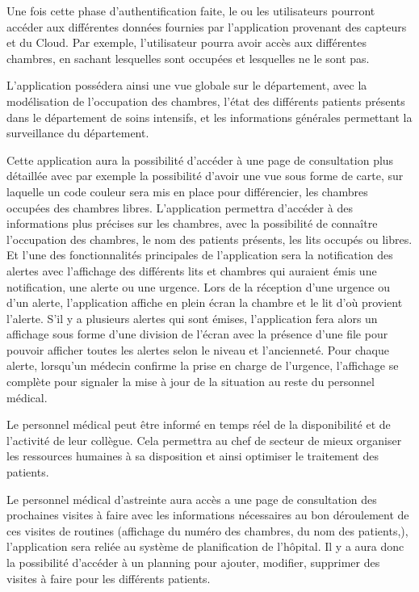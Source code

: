 Une fois cette phase d’authentification faite, le ou les utilisateurs pourront accéder aux différentes données fournies par l’application provenant des capteurs et du Cloud. Par exemple, l’utilisateur pourra avoir accès aux différentes chambres, en sachant lesquelles sont occupées et lesquelles ne le sont pas.


L’application possédera ainsi une vue globale sur le département, avec la modélisation de l’occupation des chambres, l’état des différents patients présents dans le département de soins intensifs, et les informations générales permettant la surveillance du département.

Cette application aura la possibilité d’accéder à une page de consultation plus détaillée avec par exemple la possibilité d’avoir une vue sous forme de carte, sur laquelle un code couleur sera mis en place pour différencier, les chambres occupées des chambres libres. L’application permettra d’accéder à des informations plus précises sur les chambres, avec la possibilité de connaître l’occupation des chambres, le nom des patients présents, les lits occupés ou libres. Et l’une des fonctionnalités principales de l’application sera la notification des alertes avec l’affichage des différents lits et chambres qui auraient émis une notification, une alerte ou une urgence. Lors de la réception d’une urgence ou d’un alerte, l’application affiche en plein écran la chambre et le lit d’où provient l’alerte. S’il y a plusieurs alertes qui sont émises, l’application fera alors un affichage sous forme d’une division de l’écran avec la présence d’une file pour pouvoir afficher toutes les alertes selon le niveau et l’ancienneté. Pour chaque alerte, lorsqu’un médecin confirme la prise en charge de l’urgence, l’affichage se complète pour signaler la mise à jour de la situation au reste du personnel médical.

Le personnel médical peut être informé en temps réel de la disponibilité et de l’activité de leur collègue. Cela permettra au chef de secteur de mieux organiser les ressources humaines à sa disposition et ainsi optimiser le traitement des patients.

Le personnel médical d’astreinte aura accès a une page de consultation des prochaines visites à faire avec les informations nécessaires au bon déroulement de ces visites de routines (affichage du numéro des chambres, du nom des patients,), l’application sera reliée au système de planification de l’hôpital. Il y a aura donc la possibilité d’accéder à un planning pour ajouter, modifier, supprimer des visites à faire pour les différents patients.
\\

